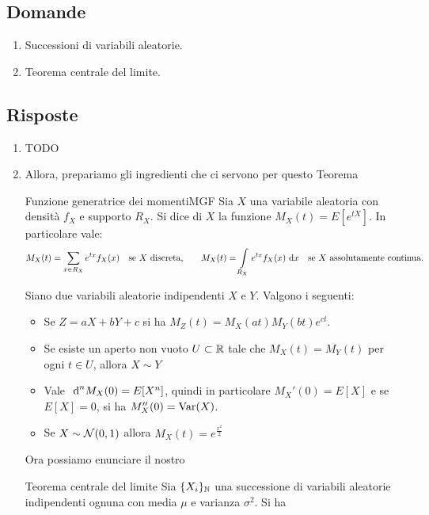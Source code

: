\documentclass{article}
\begin{document}
\subsection*{Domande}

\begin{enumerate}
    \item Successioni di variabili aleatorie.
    \item Teorema centrale del limite.
\end{enumerate}

\subsection*{Risposte}

\begin{enumerate}
    \item TODO
    \item Allora, prepariamo gli ingredienti che ci servono per questo Teorema
    \begin{definition}{Funzione generatrice dei momenti}{MGF}
        Sia $X$ una variabile aleatoria con densità $f_X$ e supporto $R_X$. Si dice  di $X$ la funzione $M_X(t) = E[e^{tX}]$. In particolare vale:
        \[M_X(t) = \sum_{x \in R_X} e^{tx} f_X(x)\quad \text{se }X\text{ discreta,}\qquad M_X(t) = \int\limits_{R_X} e^{tx} f_X(x)\text{ d} x \quad \text{se }X\text{ assolutamente continua.}\]
    \end{definition}
    \begin{lemma}{}{}
        Siano due variabili aleatorie indipendenti $X$ e $Y$. Valgono i seguenti:
        \begin{itemize}
            \item Se $Z = aX + bY + c$ si ha $M_Z(t) =M_X(at)M_Y(bt)e^{ct}$.
            \item Se esiste un aperto non vuoto $U\subset \mathbb{R}$ tale che $M_X(t) = M_Y(t)$ per ogni $t \in U$, allora $X\sim Y$ 
            \item Vale $\text{ d}^n M_X(0) = E[X^n]$, quindi in particolare $M_X'(0) = E[X]$ e se $E[X]=0$, si ha $M_X''(0) = \operatorname{Var}(X)$.
            \item Se $X\sim \mathcal{N}(0,1)$ allora $M_X(t) = e^\frac{x^2}{2}$
        \end{itemize}
    \end{lemma}
    Ora possiamo enunciare il nostro
    \begin{theorem}{Teorema centrale del limite}{}
        Sia $\{X_i\}_{\mathbb{N}}$ una successione di variabili aleatorie indipendenti ognuna con media $\mu$ e varianza $\sigma^2$. Si ha

\end{theorem}
\end{enumerate}
\end{document}
